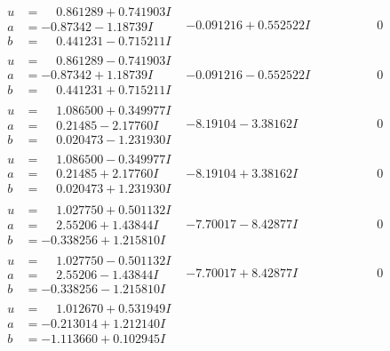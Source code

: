 \documentclass[1p]{elsarticle_modified}
\theoremstyle{definition}
\begin{document}
$$\begin{array}{c|c|c}
\begin{aligned}
u &= \phantom{-}0.861289 + 0.741903 I \\
a &= -0.87342 - 1.18739 I \\
b &= \phantom{-}0.441231 - 0.715211 I\end{aligned}
 & -0.091216 + 0.552522 I & \phantom{-0.000000 } 0 \\ \hline\begin{aligned}
u &= \phantom{-}0.861289 - 0.741903 I \\
a &= -0.87342 + 1.18739 I \\
b &= \phantom{-}0.441231 + 0.715211 I\end{aligned}
 & -0.091216 - 0.552522 I & \phantom{-0.000000 } 0 \\ \hline\begin{aligned}
u &= \phantom{-}1.086500 + 0.349977 I \\
a &= \phantom{-}0.21485 - 2.17760 I \\
b &= \phantom{-}0.020473 - 1.231930 I\end{aligned}
 & -8.19104 - 3.38162 I & \phantom{-0.000000 } 0 \\ \hline\begin{aligned}
u &= \phantom{-}1.086500 - 0.349977 I \\
a &= \phantom{-}0.21485 + 2.17760 I \\
b &= \phantom{-}0.020473 + 1.231930 I\end{aligned}
 & -8.19104 + 3.38162 I & \phantom{-0.000000 } 0 \\ \hline\begin{aligned}
u &= \phantom{-}1.027750 + 0.501132 I \\
a &= \phantom{-}2.55206 + 1.43844 I \\
b &= -0.338256 + 1.215810 I\end{aligned}
 & -7.70017 - 8.42877 I & \phantom{-0.000000 } 0 \\ \hline\begin{aligned}
u &= \phantom{-}1.027750 - 0.501132 I \\
a &= \phantom{-}2.55206 - 1.43844 I \\
b &= -0.338256 - 1.215810 I\end{aligned}
 & -7.70017 + 8.42877 I & \phantom{-0.000000 } 0 \\ \hline\begin{aligned}
u &= \phantom{-}1.012670 + 0.531949 I \\
a &= -0.213014 + 1.212140 I \\
b &= -1.113660 + 0.102945 I\end{aligned}

\end{array}$$
\end{document}

